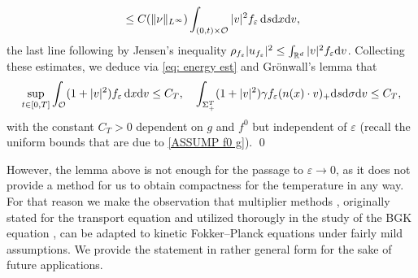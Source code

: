 \documentclass[10pt, reqno]{amsart}
\theoremstyle{plain}
\theoremstyle{definition}
\theoremstyle{remark}
\renewenvironment{proof}[1][\proofname]{\noindent{\scshape #1.\quad}}{\qed}
\numberwithin{equation}{section}
\newcommand{\calO}{\mathcal O}
\newcommand{\R}{\mathbb{R}}
\newcommand{\ve}{\varepsilon}
\newcommand{\dx}{\textnormal{d}x}
\newcommand{\dv}{\textnormal{d}v}
\newcommand{\ds}{\textnormal{d}s}
\newcommand{\tnd}{\textnormal{d}}
\newcommand{\intr}{\int_{\R^d}}
\begin{document}
\begin{proof}
\begin{align*}
    &\quad \le C(\|\nu\|_{L^\infty}) \int_{(0,t)\times \calO} |v|^2 f_\ve \,\ds\dx\dv,
\end{align*}
the last line following by Jensen's inequality $\rho_{f_\ve}|u_{f_\ve}|^2 \le \intr |v|^2 f_\ve\dv$. Collecting these estimates, we deduce via \eqref{eq: energy est} and Gr\"onwall's lemma that
\begin{align*}
    \sup_{t\in [0,T]} \int_{\calO} (1+|v|^2) f_\ve \,\dx\dv \le C_T,  \quad \int_{\Sigma_+^T} (1+|v|^2) \gamma f_\ve (n(x)\cdot v)_+ \ds\tnd\sigma\dv \le C_T,
\end{align*}
with the constant $C_T>0$ dependent on $g$ and $f^0$ but independent of $\ve$ (recall the uniform bounds that are due to \eqref{ASSUMP f0 g}).
\end{proof}

However, the lemma above is not enough for the passage to $\ve\to 0$, as it does not provide a method for us to obtain compactness for the temperature in any way. For that reason we make the observation that multiplier methods \cite{Perthame1992, perthame1996, Perthame2004}, originally stated for the transport equation and utilized thorougly in the study of the BGK equation \cite{ChenZhang2016, ChoiYun20}, can be adapted to kinetic Fokker--Planck equations under fairly mild assumptions. We provide the statement in rather general form for the sake of future applications.
\end{document}
